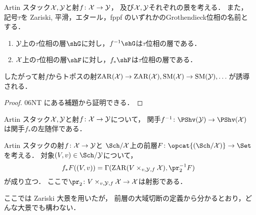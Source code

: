     \begin{Lemma}[]
        Artin スタック$\mathcal{X},\mathcal{Y}$と射$f \colon \mathcal{X} \to \mathcal{Y}$，
        及び$\mathcal{X},\mathcal{Y}$それぞれの景を考える．
        また，記号$\tau$を Zariski, 平滑，エタール，fppf のいずれかのGrothendieck位相の名前とする．
        \begin{enumerate}
            \item $\mathcal{Y}$上の$\tau$位相の層$\shG$に対し，$f^{-1}\shG$は$\tau$位相の層である．
            \item $\mathcal{X}$上の$\tau$位相の層$\shF$に対し，$f_*\shF$は$\tau$位相の層である．
        \end{enumerate}
        したがって射$f$からトポスの射$\mathrm{ZAR}(\mathcal{X}) \to \mathrm{ZAR}(\mathcal{X}), \mathrm{SM}(\mathcal{X}) \to \mathrm{SM}(\mathcal{Y}), \dots$が誘導される．
    \end{Lemma}
    \begin{proof}
        \cite{SP} 06NT にある補題から証明できる．
    \end{proof}

    \begin{Lemma}
        Artin スタック$\mathcal{X},\mathcal{Y}$と射$f \colon \mathcal{X} \to \mathcal{Y}$について，
        関手$f^{-1} \colon \PShv(\stY) \to \PShv(\stX)$は関手$f_*$の左随伴である．
    \end{Lemma}

    \begin{Lemma}[\cite{SP} 06W5]
        Artin スタックの射$f \colon \mathcal{X} \to \mathcal{Y}$と
        $\Sch/\stX$上の前層$F \colon \opcat{(\Sch/\stX)} \to \Set$を考える．
        対象$(V,v) \in \Sch/\stY$について，
        \[ f_*F((V,v))=\Gamma(\ZAR(V \times_{v,\stY,f} \stX), \pr_2^{-1}F) \]
        が成り立つ．
        ここで$\pr_2 \colon V \times_{v,\stY,f} \stX \to \stX$は射影である．
    \end{Lemma}
    ここでは Zariski 大景を用いたが，
    前層の大域切断の定義から分かるとおり，どんな大景でも構わない．

